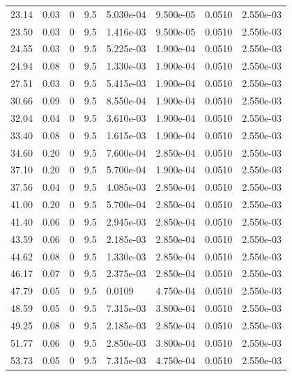 \documentclass[preview]{standalone}
\begin{document}
{{\begin{tabular}{L{1.2cm}C{1.2cm} C{0.3cm}C{0.5cm} C{1.4cm}C{1.4cm} C{1.4cm}C{1.4cm}}
  23.14  &  0.03  & 0     & 9.5 &  5.030e-04  & 9.500e-05  & 0.0510 &  2.550e-03   \\ 
  23.50  &  0.03  & 0     & 9.5 &  1.416e-03  & 9.500e-05  & 0.0510 &  2.550e-03   \\ 
  24.55  &  0.03  & 0     & 9.5 &  5.225e-03  & 1.900e-04  & 0.0510 &  2.550e-03   \\ 
  24.94  &  0.08  & 0     & 9.5 &  1.330e-03  & 1.900e-04  & 0.0510 &  2.550e-03   \\ 
  27.51  &  0.03  & 0     & 9.5 &  5.415e-03  & 1.900e-04  & 0.0510 &  2.550e-03   \\ 
  30.66  &  0.09  & 0     & 9.5 &  8.550e-04  & 1.900e-04  & 0.0510 &  2.550e-03   \\ 
  32.04  &  0.04  & 0     & 9.5 &  3.610e-03  & 1.900e-04  & 0.0510 &  2.550e-03   \\ 
  33.40  &  0.08  & 0     & 9.5 &  1.615e-03  & 1.900e-04  & 0.0510 &  2.550e-03   \\ 
  34.60  &  0.20  & 0     & 9.5 &  7.600e-04  & 2.850e-04  & 0.0510 &  2.550e-03   \\ 
  37.10  &  0.20  & 0     & 9.5 &  5.700e-04  & 1.900e-04  & 0.0510 &  2.550e-03   \\ 
  37.56  &  0.04  & 0     & 9.5 &  4.085e-03  & 2.850e-04  & 0.0510 &  2.550e-03   \\ 
  41.00  &  0.20  & 0     & 9.5 &  5.700e-04  & 2.850e-04  & 0.0510 &  2.550e-03   \\ 
  41.40  &  0.06  & 0     & 9.5 &  2.945e-03  & 2.850e-04  & 0.0510 &  2.550e-03   \\ 
  43.59  &  0.06  & 0     & 9.5 &  2.185e-03  & 2.850e-04  & 0.0510 &  2.550e-03   \\ 
  44.62  &  0.08  & 0     & 9.5 &  1.330e-03  & 2.850e-04  & 0.0510 &  2.550e-03   \\ 
  46.17  &  0.07  & 0     & 9.5 &  2.375e-03  & 2.850e-04  & 0.0510 &  2.550e-03   \\ 
  47.79  &  0.05  & 0     & 9.5 &  0.0109  & 4.750e-04  & 0.0510 &  2.550e-03   \\ 
  48.59  &  0.05  & 0     & 9.5 &  7.315e-03  & 3.800e-04  & 0.0510 &  2.550e-03   \\ 
  49.25  &  0.08  & 0     & 9.5 &  2.185e-03  & 2.850e-04  & 0.0510 &  2.550e-03   \\ 
  51.77  &  0.06  & 0     & 9.5 &  2.850e-03  & 3.800e-04  & 0.0510 &  2.550e-03   \\ 
  53.73  &  0.05  & 0     & 9.5 &  7.315e-03  & 4.750e-04  & 0.0510 &  2.550e-03   \\ 

\end{tabular}}}
\end{document}
